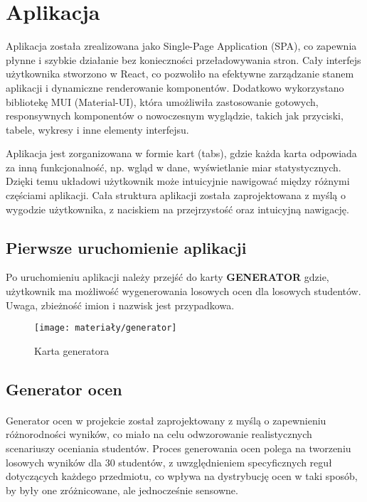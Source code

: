 \section{Aplikacja}
Aplikacja została zrealizowana jako Single-Page Application (SPA), co zapewnia płynne i szybkie działanie bez konieczności przeładowywania stron. Cały interfejs użytkownika stworzono w React, co pozwoliło na efektywne zarządzanie stanem aplikacji i dynamiczne renderowanie komponentów. Dodatkowo wykorzystano bibliotekę MUI (Material-UI), która umożliwiła zastosowanie gotowych, responsywnych komponentów o nowoczesnym wyglądzie, takich jak przyciski, tabele, wykresy i inne elementy interfejsu.

Aplikacja jest zorganizowana w formie kart (tabs), gdzie każda karta odpowiada za inną funkcjonalność, np. wgląd w dane, wyświetlanie miar statystycznych. Dzięki temu układowi użytkownik może intuicyjnie nawigować między różnymi częściami aplikacji. Cała struktura aplikacji została zaprojektowana z myślą o wygodzie użytkownika, z naciskiem na przejrzystość oraz intuicyjną nawigację.

\subsection{Pierwsze uruchomienie aplikacji}
Po uruchomieniu aplikacji należy przejść do karty \textbf{GENERATOR} gdzie, użytkownik ma możliwość wygenerowania losowych ocen dla losowych studentów. Uwaga, zbieżność imion i nazwisk jest przypadkowa. 

\begin{figure}[ht]
	\centering
	\texttt{[image: materiały/generator]}
	\caption{Karta generatora}
\end{figure}

\subsection{Generator ocen}
\paragraph{} Generator ocen w projekcie został zaprojektowany z myślą o zapewnieniu różnorodności wyników, co miało na celu odwzorowanie realistycznych scenariuszy oceniania studentów. Proces generowania ocen polega na tworzeniu losowych wyników dla 30 studentów, z uwzględnieniem specyficznych reguł dotyczących każdego przedmiotu, co wpływa na dystrybucję ocen w taki sposób, by były one zróżnicowane, ale jednocześnie sensowne.

